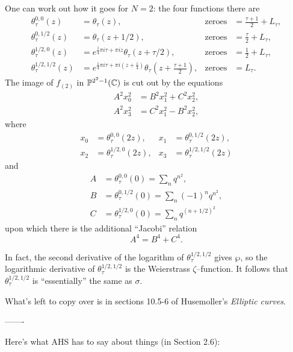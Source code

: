One can work out how it goes for $N = 2$: the four functions there are
\begin{align*}
\theta_\tau^{0, 0}(z) & = \theta_\tau(z), & \mathrm{zeroes} & = \frac{\tau + 1}{2} + L_\tau, \\
\theta_\tau^{0, 1/2}(z) & = \theta_\tau(z + 1/2), & \mathrm{zeroes} & = \frac{\tau}{2} + L_\tau, \\
\theta_\tau^{1/2, 0}(z) & = e^{\frac{1}{4} \pi i \tau + \pi i z} \theta_\tau(z + \tau/2), & \mathrm{zeroes} & = \frac{1}{2} + L_\tau, \\
\theta_\tau^{1/2, 1/2}(z) & = e^{\frac{1}{4} \pi i \tau + \pi i (z + \frac{1}{4})} \theta_\tau\left(z + \frac{\tau + 1}{2}\right), & \mathrm{zeroes} & = L_\tau.
\end{align*}
The image of $f_{(2)}$ in $\mathbb{P}^{2^2 - 1}(\mathbb{C})$ is cut out by the equations
\begin{align*}
A^2 x_0^2 & = B^2 x_1^2 + C^2 x_2^2, \\
A^2 x_3^2 & = C^2 x_1^2 - B^2 x_2^2,
\end{align*}
where
\begin{align*}
x_0 & = \theta_\tau^{0, 0}(2z), &
x_1 & = \theta_\tau^{0, 1/2}(2z), \\
x_2 & = \theta_\tau^{1/2, 0}(2z), &
x_3 & = \theta_\tau^{1/2, 1/2}(2z)
\end{align*}
and
\begin{align*}
A & = \theta_\tau^{0, 0}(0) = \sum_n q^{n^2}, \\
B & = \theta_\tau^{0, 1/2}(0) = \sum_n (-1)^n q^{n^2}, \\
C & = \theta_\tau^{1/2, 0}(0) = \sum_n q^{(n + 1/2)^2}
\end{align*}
upon which there is the additional ``Jacobi'' relation \[A^4 = B^4 + C^4.\]

In fact, the second derivative of the logarithm of $\theta_\tau^{1/2, 1/2}$ gives $\wp$, so the logarithmic derivative of $\theta_\tau^{1/2,1/2}$ is the Weierstrass $\zeta$--function.  It follows that $\theta_\tau^{1/2,1/2}$ is ``essentially'' the same as $\sigma$.

What's left to copy over is in sections 10.5-6 of Husemoller's \textit{Elliptic curves}.

-------

Here's what AHS has to say about things (in Section 2.6):

